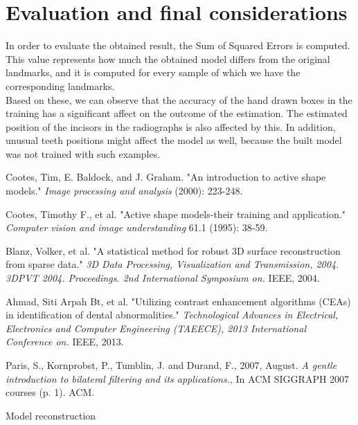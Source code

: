 \documentclass[a4paper]{article}
\begin{document}
\section{Evaluation and final considerations}\label{sec:evaluation}
In order to evaluate the obtained result, the Sum of Squared Errors is computed. This value represents how much the obtained model differs from the original landmarks, and it is computed for every sample of which we have the corresponding landmarks. \\
Based on these, we can observe that the accuracy of the hand drawn boxes in the training has a significant affect on the outcome of the estimation. The estimated position of the incisors in the radiographs is also affected by this. In addition, unusual teeth positions might affect the model as well, because the built model was not trained with such examples.


\newpage
\begin{thebibliography}{99}

 Cootes, Tim, E. Baldock, and J. Graham. "An introduction to active shape models." \textit{Image processing and analysis} (2000): 223-248.

 Cootes, Timothy F., et al. "Active shape models-their training and application." \textit{Computer vision and image understanding} 61.1 (1995): 38-59.

 Blanz, Volker, et al. "A statistical method for robust 3D surface reconstruction from sparse data." \textit{3D Data Processing, Visualization and Transmission, 2004. 3DPVT 2004. Proceedings. 2nd International Symposium on.} IEEE, 2004.

 Ahmad, Siti Arpah Bt, et al. "Utilizing contrast enhancement algorithms (CEAs) in identification of dental abnormalities." \textit{Technological Advances in Electrical, Electronics and Computer Engineering (TAEECE), 2013 International Conference on.} IEEE, 2013.

 Paris, S., Kornprobst, P., Tumblin, J. and Durand, F., 2007, August. \textit{A gentle introduction to bilateral filtering and its applications.}, In ACM SIGGRAPH 2007 courses (p. 1). ACM.

Model reconstruction 

% 

\end{thebibliography}
\end{document}
